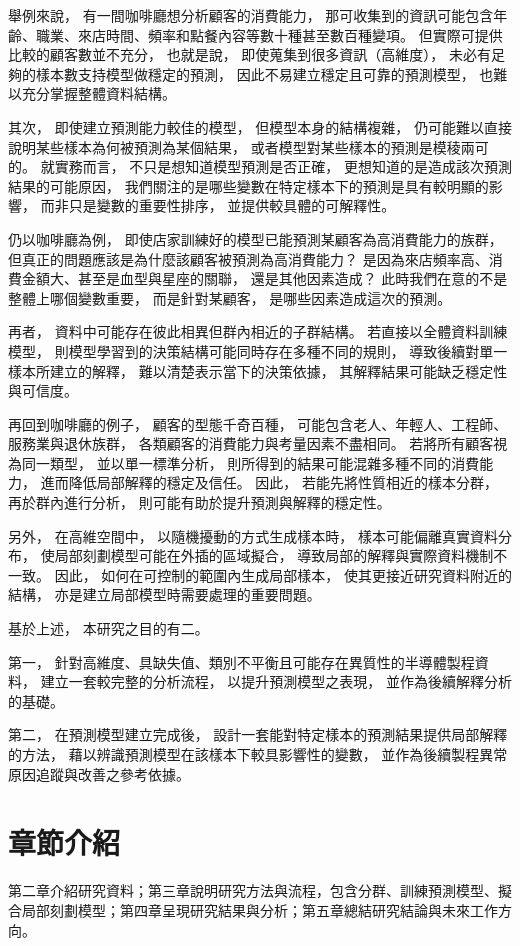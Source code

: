 \documentclass[12pt,a4paper,oneside]{book}
\begin{document}
	舉例來說，
	有一間咖啡廳想分析顧客的消費能力，
	那可收集到的資訊可能包含年齡、職業、來店時間、頻率和點餐內容等數十種甚至數百種變項。
	但實際可提供比較的顧客數並不充分，
	也就是說，
	即使蒐集到很多資訊（高維度），
	未必有足夠的樣本數支持模型做穩定的預測，
	因此不易建立穩定且可靠的預測模型，
	也難以充分掌握整體資料結構。

	其次，
	即使建立預測能力較佳的模型，
	但模型本身的結構複雜，
	仍可能難以直接說明某些樣本為何被預測為某個結果，
	或者模型對某些樣本的預測是模稜兩可的。
	就實務而言，
	不只是想知道模型預測是否正確，
	更想知道的是造成該次預測結果的可能原因，
	我們關注的是哪些變數在特定樣本下的預測是具有較明顯的影響，
	而非只是變數的重要性排序，
	並提供較具體的可解釋性。

	仍以咖啡廳為例，
	即使店家訓練好的模型已能預測某顧客為高消費能力的族群，
	但真正的問題應該是為什麼該顧客被預測為高消費能力？
	是因為來店頻率高、消費金額大、甚至是血型與星座的關聯，
	還是其他因素造成？
	此時我們在意的不是整體上哪個變數重要，
	而是針對某顧客，
	是哪些因素造成這次的預測。

	再者，
	資料中可能存在彼此相異但群內相近的子群結構。
	若直接以全體資料訓練模型，
	則模型學習到的決策結構可能同時存在多種不同的規則，
	導致後續對單一樣本所建立的解釋，
	難以清楚表示當下的決策依據，
	其解釋結果可能缺乏穩定性與可信度。
	
	再回到咖啡廳的例子，
	顧客的型態千奇百種，
	可能包含老人、年輕人、工程師、服務業與退休族群，
	各類顧客的消費能力與考量因素不盡相同。
	若將所有顧客視為同一類型，
	並以單一標準分析，
	則所得到的結果可能混雜多種不同的消費能力，
	進而降低局部解釋的穩定及信任。
	因此，
	若能先將性質相近的樣本分群，
	再於群內進行分析，
	則可能有助於提升預測與解釋的穩定性。

	另外，
	在高維空間中，
	以隨機擾動的方式生成樣本時，
	樣本可能偏離真實資料分布，
	使局部刻劃模型可能在外插的區域擬合，
	導致局部的解釋與實際資料機制不一致。
	因此，
	如何在可控制的範圍內生成局部樣本，
	使其更接近研究資料附近的結構，
	亦是建立局部模型時需要處理的重要問題。

	基於上述，
	本研究之目的有二。

	第一，
	針對高維度、具缺失值、類別不平衡且可能存在異質性的半導體製程資料，
	建立一套較完整的分析流程，
	以提升預測模型之表現，
	並作為後續解釋分析的基礎。

	第二，
	在預測模型建立完成後，
	設計一套能對特定樣本的預測結果提供局部解釋的方法，
	藉以辨識預測模型在該樣本下較具影響性的變數，
	並作為後續製程異常原因追蹤與改善之參考依據。

	\section{章節介紹}
	第二章介紹研究資料；第三章說明研究方法與流程，包含分群、訓練預測模型、擬合局部刻劃模型；第四章呈現研究結果與分析；第五章總結研究結論與未來工作方向。
\end{document}

